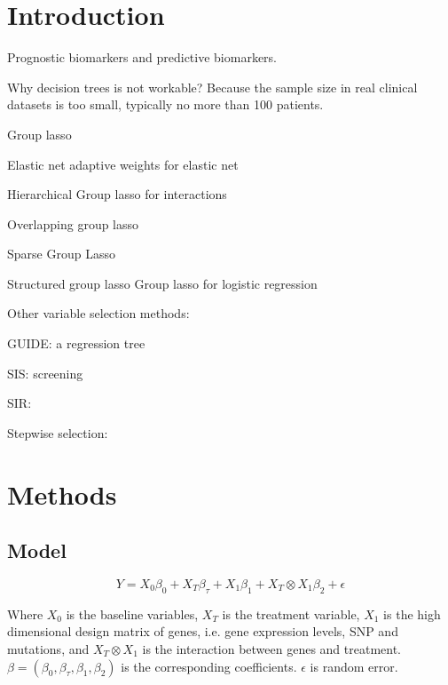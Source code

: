 \documentclass[12pt]{article}
\begin{document}
\section*{Introduction}

Prognostic biomarkers and predictive biomarkers.

Why decision trees is not workable? Because the sample size in real clinical datasets is too small, typically no more than 100 patients.

Group lasso \cite{yuan2006model}

Elastic net \cite{zou2005regularization} adaptive weights for elastic net \cite{zou2009adaptive}

Hierarchical Group lasso for interactions \cite{lim2015learning}

Overlapping group lasso \cite{jacob2009group}\cite{percival2012theoretical}\cite{obozinski2011group}

Sparse Group Lasso \cite{friedman2010note} \cite{simon2013sparse}

Structured group lasso \cite{zhao2009composite}
Group lasso for logistic regression \cite{meier2008group}

Other variable selection methods:

GUIDE: a regression tree \cite{loh2015regression}\cite{loh2002regression}

SIS: screening \cite{fan2008sure}\cite{fan2009ultrahigh}

SIR: \cite{jiang2013sliced}\cite{li2018robust}

Stepwise selection: \cite{miller1984selection}

\section*{Methods}

\subsection*{Model}


$$Y=X_0\beta_0 + X_T\beta_\tau + X_1\beta_1 + X_T\otimes X_1 \beta_2+\epsilon$$


Where $X_0$ is the baseline variables, $X_T$ is the treatment variable, $X_1$ is the high dimensional design matrix of genes, i.e. gene expression levels, SNP and mutations, and $X_T\otimes X_1$ is the interaction between genes and treatment. $\beta=(\beta_0, \beta_\tau, \beta_1, \beta_2)$ is the corresponding coefficients. $\epsilon$ is random error.
\end{document}
